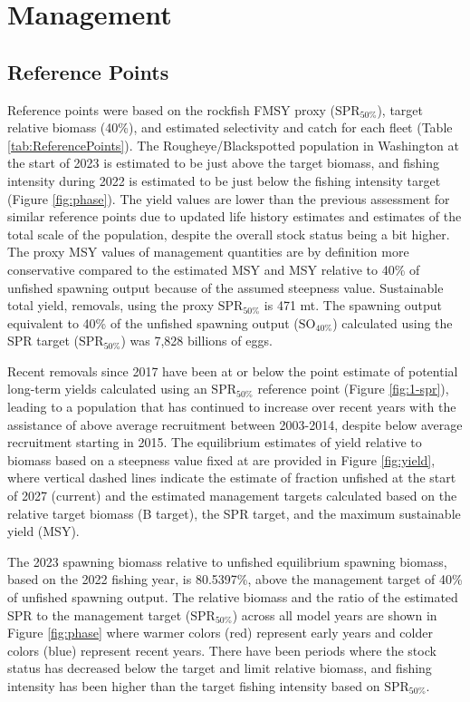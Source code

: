 \documentclass[
]{scrartcl}
\begin{document}
\newpage{}

\section{Management}\label{management}

\subsection{Reference Points}\label{reference-points-1}

Reference points were based on the rockfish FMSY proxy
(\(\text{SPR}_{50\%}\)), target relative biomass (40\%), and estimated
selectivity and catch for each fleet (Table \ref{tab:ReferencePoints}).
The Rougheye/Blackspotted population in Washington at the start of 2023
is estimated to be just above the target biomass, and fishing intensity
during 2022 is estimated to be just below the fishing intensity target
(Figure \ref{fig:phase}). The yield values are lower than the previous
assessment for similar reference points due to updated life history
estimates and estimates of the total scale of the population, despite
the overall stock status being a bit higher. The proxy MSY values of
management quantities are by definition more conservative compared to
the estimated MSY and MSY relative to 40\% of unfished spawning output
because of the assumed steepness value. Sustainable total yield,
removals, using the proxy \(\text{SPR}_{50\%}\) is 471 mt. The spawning
output equivalent to 40\% of the unfished spawning output
(\(\text{SO}_{40\%}\)) calculated using the SPR target
(\(\text{SPR}_{50\%}\)) was 7,828 billions of eggs.

Recent removals since 2017 have been at or below the point estimate of
potential long-term yields calculated using an \(\text{SPR}_{50\%}\)
reference point (Figure \ref{fig:1-spr}), leading to a population that
has continued to increase over recent years with the assistance of above
average recruitment between 2003-2014, despite below average recruitment
starting in 2015. The equilibrium estimates of yield relative to biomass
based on a steepness value fixed at are provided in Figure
\ref{fig:yield}, where vertical dashed lines indicate the estimate of
fraction unfished at the start of 2027 (current) and the estimated
management targets calculated based on the relative target biomass (B
target), the SPR target, and the maximum sustainable yield (MSY).

The 2023 spawning biomass relative to unfished equilibrium spawning
biomass, based on the 2022 fishing year, is 80.5397\%, above the
management target of 40\% of unfished spawning output. The relative
biomass and the ratio of the estimated SPR to the management target
(\(\text{SPR}_{50\%}\)) across all model years are shown in Figure
\ref{fig:phase} where warmer colors (red) represent early years and
colder colors (blue) represent recent years. There have been periods
where the stock status has decreased below the target and limit relative
biomass, and fishing intensity has been higher than the target fishing
intensity based on \(\text{SPR}_{50\%}\).
\end{document}
